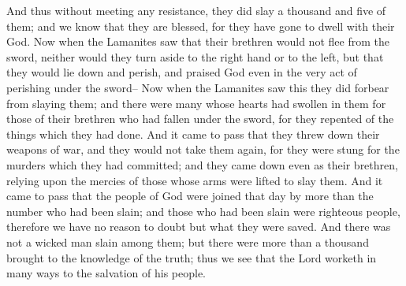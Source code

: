 And thus without meeting any resistance, they did slay a thousand and five of them; and we know that they are blessed, for they have gone to dwell with their God.
\bverse \iffalse Now when the Lamanites saw that their brethren would not flee from the sword, neither would they turn aside to the right hand or to the left, but that they would lie down and perish, and praised God even in the very act of perishing under the sword-- \fi
Now when the Lamanites saw that their brethren would not flee from the sword, neither would they turn aside to the right hand or to the left, but that they would lie down and perish, and praised God even in the very act of perishing under the sword--
\bverse \iffalse Now when the Lamanites saw this they did forbear from slaying them; and there were many whose hearts had swollen in them for those of their brethren who had fallen under the sword, for they repented of the things which they had done. \fi
Now when the Lamanites saw this they did forbear from slaying them; and there were many whose hearts had swollen in them for those of their brethren who had fallen under the sword, for they repented of the things which they had done.
\bverse \iffalse And it came to pass that they threw down their weapons of war, and they would not take them again, for they were stung for the murders which they had committed; and they came down even as their brethren, relying upon the mercies of those whose arms were lifted to slay them. \fi
And it came to pass that they threw down their weapons of war, and they would not take them again, for they were stung for the murders which they had committed; and they came down even as their brethren, relying upon the mercies of those whose arms were lifted to slay them.
\bverse \iffalse And it came to pass that the people of God were joined that day by more than the number who had been slain; and those who had been slain were righteous people, therefore we have no reason to doubt but what they were saved. \fi
And it came to pass that the people of God were joined that day by more than the number who had been slain; and those who had been slain were righteous people, therefore we have no reason to doubt but what they were saved.
\bverse \iffalse And there was not a wicked man slain among them; but there were more than a thousand brought to the knowledge of the truth; thus we see that the Lord worketh in many ways to the salvation of his people. \fi
And there was not a wicked man slain among them; but there were more than a thousand brought to the knowledge of the truth; thus we see that the Lord worketh in many ways to the salvation of his people.
